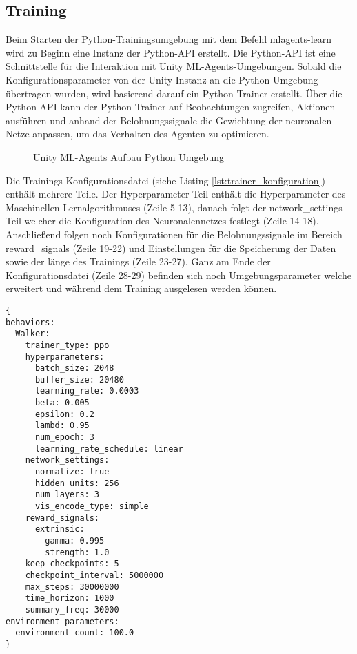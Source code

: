 \subsection{Training}
Beim Starten der Python-Trainingsumgebung mit dem Befehl mlagents-learn wird zu Beginn eine Instanz der Python-API erstellt. Die Python-API ist eine Schnittstelle für die Interaktion mit Unity ML-Agents-Umgebungen. Sobald die Konfigurationsparameter von der Unity-Instanz an die Python-Umgebung übertragen wurden, wird basierend darauf ein Python-Trainer erstellt. Über die Python-API kann der Python-Trainer auf Beobachtungen zugreifen, Aktionen ausführen und anhand der Belohnungssignale die Gewichtung der neuronalen Netze anpassen, um das Verhalten des Agenten zu optimieren.

\begin{figure}[H]
  \centering  
  \caption{Unity ML-Agents Aufbau Python Umgebung}
  \label{fig:mlagents_aufbau_python}
\end{figure}

Die Trainings Konfigurationsdatei (siehe Listing \ref{lst:trainer_konfiguration}) enthält mehrere Teile. Der Hyperparameter Teil enthält die Hyperparameter des Maschinellen Lernalgorithmuses (Zeile 5-13), danach folgt der network\_settings Teil welcher die Konfiguration des Neuronalennetzes festlegt (Zeile 14-18). Anschließend folgen noch Konfigurationen für die Belohnungssignale im Bereich reward\_signals (Zeile 19-22) und Einstellungen für die Speicherung der Daten sowie der länge des Trainings (Zeile 23-27). Ganz am Ende der Konfigurationsdatei (Zeile 28-29) befinden sich noch Umgebungsparameter welche erweitert und während dem Training ausgelesen werden können.

\begin{lstlisting}[caption={Trainer Konfigurationsdatei},captionpos=b,label={lst:trainer_konfiguration}]
{
behaviors:
  Walker:
    trainer_type: ppo
    hyperparameters:
      batch_size: 2048
      buffer_size: 20480
      learning_rate: 0.0003
      beta: 0.005
      epsilon: 0.2
      lambd: 0.95
      num_epoch: 3
      learning_rate_schedule: linear
    network_settings:
      normalize: true
      hidden_units: 256
      num_layers: 3
      vis_encode_type: simple
    reward_signals:
      extrinsic:
        gamma: 0.995
        strength: 1.0
    keep_checkpoints: 5
    checkpoint_interval: 5000000
    max_steps: 30000000
    time_horizon: 1000
    summary_freq: 30000
environment_parameters:
  environment_count: 100.0
}
\end{lstlisting}